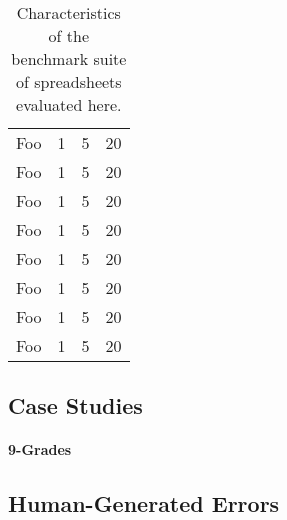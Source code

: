 \begin{table}[t!]
\begin{tabular}{l|rrr}
    \textsf{Foo} & \textsf{1} & \textsf{5}  & \textsf{20} \\
    \textsf{Foo} & \textsf{1} & \textsf{5}  & \textsf{20} \\
    \textsf{Foo} & \textsf{1} & \textsf{5}  & \textsf{20} \\
    \textsf{Foo} & \textsf{1} & \textsf{5}  & \textsf{20} \\
    \textsf{Foo} & \textsf{1} & \textsf{5}  & \textsf{20} \\
    \textsf{Foo} & \textsf{1} & \textsf{5}  & \textsf{20} \\
    \textsf{Foo} & \textsf{1} & \textsf{5}  & \textsf{20} \\
    \textsf{Foo} & \textsf{1} & \textsf{5}  & \textsf{20} \\
    \hline
    \end{tabular}%
  \caption{Characteristics of the benchmark suite of spreadsheets evaluated here.\label{tab:spreadsheet_characteristics}}
\end{table}



\subsection{Case Studies}

\paragraph{9-Grades}

\subsection{Human-Generated Errors}

